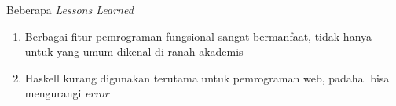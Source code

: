\documentclass{beamer}
\begin{document}
\begin{frame}{Beberapa \textit{Lessons Learned}}
    \begin{enumerate}
        \item Berbagai fitur pemrograman fungsional sangat bermanfaat, tidak hanya untuk yang umum dikenal di ranah akademis
        \item Haskell kurang digunakan terutama untuk pemrograman web, padahal bisa mengurangi \textit{error}
    \end{enumerate}
\end{frame}
\end{document}
